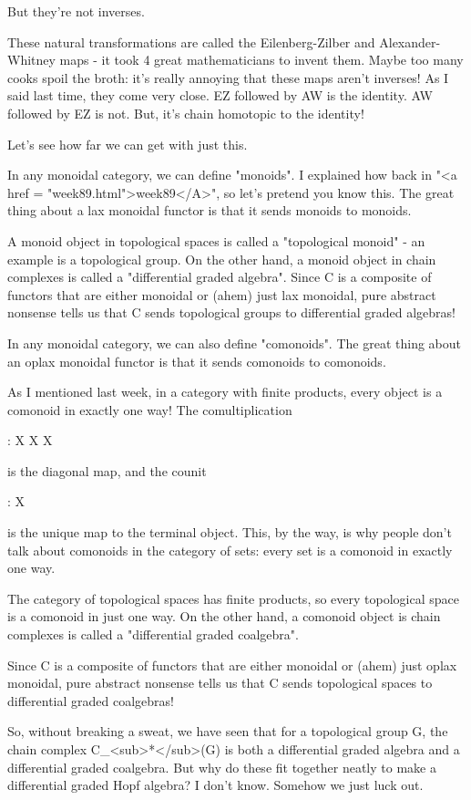 But they're not inverses.

These natural transformations are called the Eilenberg-Zilber and
Alexander-Whitney maps - it took 4 great mathematicians to invent
them.  Maybe too many cooks spoil the broth: it's really annoying that
these maps aren't inverses!  As I said last time, they come very
close.  EZ followed by AW is the identity.  AW followed by EZ is not.
But, it's chain homotopic to the identity!

Let's see how far we can get with just this.

In any monoidal category, we can define "monoids".  I
explained how back in "<a href = "week89.html">week89</A>",
so let's pretend you know this.  The great thing about a lax monoidal
functor is that it sends monoids to monoids.

A monoid object in topological spaces is called a "topological
monoid" - an example is a topological group.  On the other hand,
a monoid object in chain complexes is called a "differential
graded algebra".  Since C is a composite of functors that are
either monoidal or (ahem) just lax monoidal, pure abstract nonsense
tells us that C sends topological groups to differential graded
algebras!

In any monoidal category, we can also define "comonoids".
The great thing about an oplax monoidal functor is that it sends
comonoids to comonoids.

As I mentioned last week, in a category with finite products, every
object is a comonoid in exactly one way!  The comultiplication

\Delta : X \to  X \times  X

is the diagonal map, and the counit

\epsilon : X 

is the unique map to the terminal object.  This, by the way, is
why people don't talk about comonoids in the category of sets:
every set is a comonoid in exactly one way.

The category of topological spaces has finite products, so every
topological space is a comonoid in just one way.  On the other hand, a
comonoid object is chain complexes is called a "differential
graded coalgebra".

Since C is a composite of functors that are either monoidal or (ahem)
just oplax monoidal, pure abstract nonsense tells us that C sends
topological spaces to differential graded coalgebras!  

So, without breaking a sweat, we have seen that for a topological
group G, the chain complex C_{<sub>*}</sub>(G) is both a
differential graded algebra and a differential graded coalgebra.  But
why do these fit together neatly to make a differential graded Hopf
algebra?  I don't know.  Somehow we just luck out.

